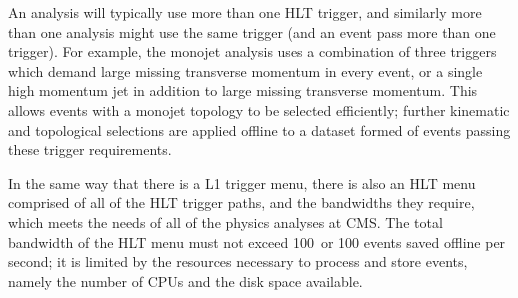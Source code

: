 An analysis will typically use more than one \ac{HLT} trigger, and similarly more than one analysis might use the same trigger (and an event pass more than one trigger).
For example, the monojet analysis %
uses a combination of three triggers which demand large missing transverse momentum in every event, or a single high momentum jet in addition to large missing transverse momentum.
This allows events with a monojet topology to be selected efficiently; further kinematic and topological selections are applied offline to a dataset formed of events passing these trigger requirements.


In the same way that there is a \ac{L1} trigger menu, there is also an \ac{HLT} menu 
comprised of all of the \ac{HLT} trigger paths, and the bandwidths they require, which meets the needs of all of the physics analyses at \ac{CMS}.
The total bandwidth of the \ac{HLT} menu must not exceed 100~\Hz or 100 events saved offline per second; it is limited by the resources necessary to process and store events, namely the number of \ac{CPU}s and the disk space available.

\clearpage
